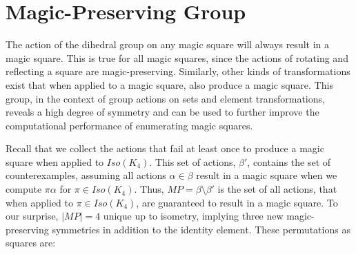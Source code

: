 \documentclass[12pt]{report}
\begin{document}
\newpage{}
\section{Magic-Preserving Group}

\par The action of the dihedral group on any magic square will always result in a magic square.
This is true for all magic squares, since the actions of rotating and reflecting a square are
magic-preserving. Similarly, other kinds of transformations exist that when applied to a
magic square, also produce a magic square. This group, in the context of group actions on sets and
element transformations, reveals a high degree of symmetry and can be used to further improve the
computational performance of enumerating magic squares.

\par Recall that we collect the actions that fail at least once to produce a magic square when applied to $Iso(K_4)$.
This set of actions, $\beta\prime$, contains the set of counterexamples, assuming all actions $\alpha\in\beta$ result in
a magic square when we compute $\pi\alpha$ for $\pi\in Iso(K_4)$. Thus, $MP=\beta\setminus\beta\prime$ is the set of all actions,
that when applied to $\pi\in Iso(K_4)$, are guaranteed to result in a magic square. To our surprise, $\left|MP\right|=4$ unique up to isometry, implying three new
magic-preserving symmetries in addition to the identity element. These permutations as squares are:
\end{document}
